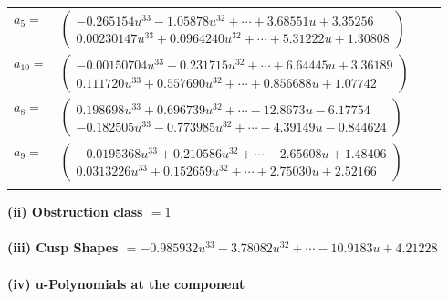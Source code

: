 \documentclass[1p]{elsarticle_modified}
\theoremstyle{definition}
\begin{document}
\begin{tabular}{m{7pt} m{180pt} m{7pt} m{180pt} }
\flushright $a_{5}=$&$\begin{pmatrix}-0.265154 u^{33}-1.05878 u^{32}+\cdots+3.68551 u+3.35256\\0.00230147 u^{33}+0.0964240 u^{32}+\cdots+5.31222 u+1.30808\end{pmatrix}$ \\
\flushright $a_{10}=$&$\begin{pmatrix}-0.00150704 u^{33}+0.231715 u^{32}+\cdots+6.64445 u+3.36189\\0.111720 u^{33}+0.557690 u^{32}+\cdots+0.856688 u+1.07742\end{pmatrix}$ \\
\flushright $a_{8}=$&$\begin{pmatrix}0.198698 u^{33}+0.696739 u^{32}+\cdots-12.8673 u-6.17754\\-0.182505 u^{33}-0.773985 u^{32}+\cdots-4.39149 u-0.844624\end{pmatrix}$ \\
\flushright $a_{9}=$&$\begin{pmatrix}-0.0195368 u^{33}+0.210586 u^{32}+\cdots-2.65608 u+1.48406\\0.0313226 u^{33}+0.152659 u^{32}+\cdots+2.75030 u+2.52166\end{pmatrix}$\\&\end{tabular}
\flushleft \textbf{(ii) Obstruction class $= 1$}\\~\\
\flushleft \textbf{(iii) Cusp Shapes $= -0.985932 u^{33}-3.78082 u^{32}+\cdots-10.9183 u+4.21228$}\\~\\
\newpage\renewcommand{\arraystretch}{1}
\flushleft \textbf{(iv) u-Polynomials at the component}\newline \\
\end{document}
